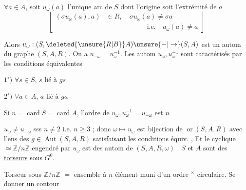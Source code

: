 $\forall a\in A$, soit $u_{\omega}(a)$ l'unique arc de $S$ dont l'origine soit l'extrémité de $a$
\[
\left[\begin{aligned}
(\sigma u_{\omega}(a),a)&\in R,\quad \sigma u_{\omega}(a)\ne\sigma a\\
&\hspace{6em}\text{i.e.}\quad u_{\omega}(a)\ne a
\end{aligned}\right]
\]

\margin{$\big\}$}Alors $u_{\omega}:(S,\deleted{\unsure{R|B}}A)\unsure{-|\to}(S,A)$ est un autom du graphe $(S,A,R)$. On a $u_{-\omega}=u_{\omega}^{-1}$. Les autom $u_{\omega},u_{\omega}^{-1}$ sont caractérisés par les  conditions équivalentes

$1^{\circ})$ $\forall s\in S$, $s$ lié à $gs$

$2^{\circ})$ $\forall a\in A$, $a$ lié à $ga$

Si $n=\operatorname{card}S=\operatorname{card}A$, l'ordre de $u_{\omega},u_{\omega}^{-1}=u_{-\omega}$ est $n$

 $u_{\omega}\ne u_{-\omega}$ sss $n\ne2$ i.e. $n\geq3$ ; donc $\omega\longmapsto u_{\omega}$ est bijection de $\operatorname{or}(S,A,R)$ avec l'ens des $g\in\operatorname{Aut}(S,A,R)$ satisfaisant les conditions équiv. , Et le  cyclique $\simeq\mathbb{Z}/n\mathbb{Z}$ engendré par $u_{\omega}$ est    des autom  de $(S,A,R,\omega)$ . $S$ et $A$ sont des \uline{torseurs} sous $G^{0}$.


Torseur sous $\mathbb{Z}/n\mathbb{Z}$  $=$ ensemble  à $n$ élément muni d'un ordre $^{\times}$ circulaire. Se donner un contour
